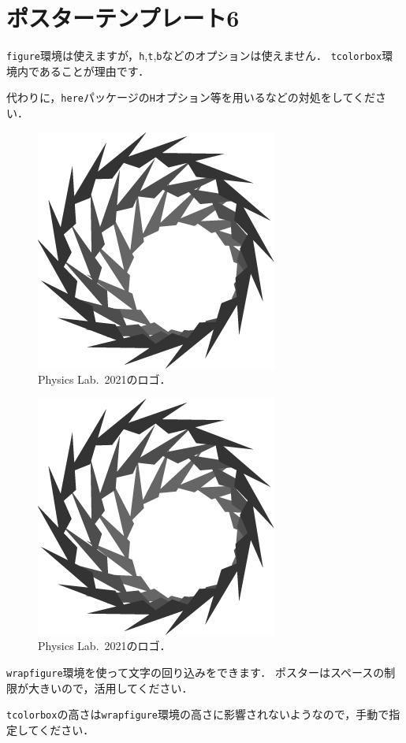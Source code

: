 \documentclass[12pt, a4j, dvipdfmx, jis2004]{jsarticle}
\begin{document}
\section*{ポスターテンプレート6}
\begin{tcbraster}[raster columns = 1]
	\begin{tcolorbox}[title = 画像（\texttt{figure}環境）]
	\texttt{figure}環境は使えますが，\texttt{h},\texttt{t},\texttt{b}などのオプションは使えません．
	\texttt{tcolorbox}環境内であることが理由です．
	
	代わりに，\texttt{here}パッケージの\texttt{H}オプション等を用いるなどの対処をしてください．
	\begin{figure}[H]
	\centering
	\includegraphics[width=0.2\linewidth]{logo_test.png}
	\caption{Physics Lab.~2021のロゴ．}
	\end{figure}
	\end{tcolorbox}
	\begin{tcolorbox}[title = 画像（\texttt{wrapfigure}環境）, height = 0.4\linewidth]
	\begin{figure}
	\centering
	\includegraphics[width=\linewidth]{logo_test.png}
	\caption{Physics Lab.~2021のロゴ．}
	\end{figure}
	\texttt{wrapfigure}環境を使って文字の回り込みをできます．
	ポスターはスペースの制限が大きいので，活用してください．
	
	\texttt{tcolorbox}の高さは\texttt{wrapfigure}環境の高さに影響されないようなので，手動で指定してください．
	\end{tcolorbox}
\end{tcbraster}
\end{document}
